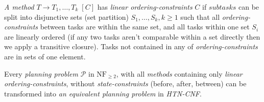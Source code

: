 \begin{defn}\label{def04:17}
    \emph{A method} $T \rightarrow T_1, \dots, T_k \; [C]$ has \emph{linear ordering-constraints} $C$ if $subtasks$ can be split into disjunctive sets (set partition) $S_1, \dots, S_k, k \geq 1$ such that all \emph{ordering-constraints} between tasks are within the same set, and all tasks within one set $S_i$ are linearly ordered (if any two tasks aren't comparable within a set directly then we apply a transitive closure). Tasks not contained in any of \emph{ordering-constraints} are in sets of one element.
\end{defn}

\begin{thm}\label{thm04:6}
    Every \emph{planning problem} $\mathcal{P}$ in $\text{NF}_{\geq 2}$, with all \emph{methods} containing only \emph{linear ordering-constraints}, without \emph{state-constraints} (before, after, between) can be transformed into \emph{an equivalent planning problem} in \emph{HTN-CNF}.
\end{thm}
